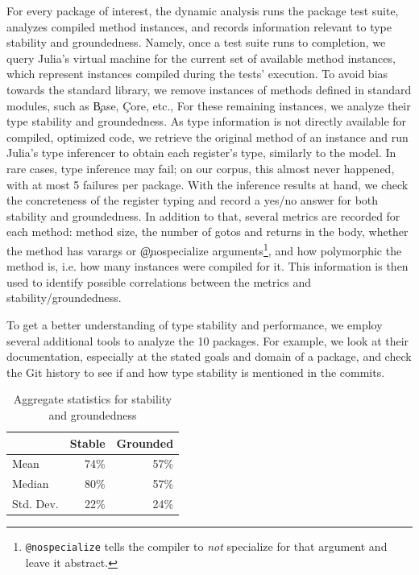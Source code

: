 For every package of interest, the dynamic analysis runs the package test suite,
analyzes compiled method instances, and records information relevant to
type stability and groundedness. Namely, once a test suite runs to completion,
we query Julia's virtual machine for the current set of available method
instances, which represent instances compiled during the tests' execution. To
avoid bias towards the standard library, we remove instances of methods defined in
standard modules, such as \c{Base}, \c{Core}, etc., 
For these remaining instances,
we analyze their type stability and groundedness. As type information is not
directly available for compiled, optimized code, we retrieve the original method
of an instance and run Julia's type inferencer to obtain each register's type,
similarly to the \jules model. In rare cases, type inference may fail;
on our corpus, this almost never happened, with at most 5 failures per package.
With the inference results at hand, we check the concreteness of the register
typing and record a yes/no answer for both stability and groundedness. In
addition to that, several metrics are recorded for each method:
method size, the number of gotos and returns in the body, whether the method has
varargs or \c{@nospecialize} arguments\footnote{\texttt{@nospecialize} tells the
compiler to \emph{not} specialize for that argument and leave it abstract.}, and
how polymorphic the method is, i.e. how many instances were compiled for it.
This information is then used to identify possible correlations between the
metrics and stability/groundedness.

To get a better understanding of type stability and performance, we employ
several additional tools to analyze the 10 packages. For example, we look at
their documentation, especially at the stated goals and domain of a package, and
check the Git history to see if and how type stability is mentioned in the
commits.

\begin{table}[t]\small
\caption{Aggregate statistics for stability and groundedness}%
\label{empirical:fig:all}
\begin{tabular}{@{}lrr@{}}
\toprule
          & \multicolumn{1}{c}{Stable} & \multicolumn{1}{c}{Grounded} \\ \midrule
Mean      & 74\%                       & 57\%                         \\
Median    & 80\%                       & 57\%                         \\
Std. Dev. & 22\%                       & 24\%                         \\ \bottomrule
\end{tabular}
\end{table}

